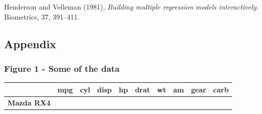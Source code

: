 \documentclass[]{article}
\begin{document}
Henderson and Velleman (1981), \emph{Building multiple regression models
interactively}. Biometrics, 37, 391--411. \newpage

\subsection{Appendix}\label{appendix}

\subsubsection{Figure 1 - Some of the
data}\label{figure-1---some-of-the-data}

\begin{longtable}[c]{@{}cccccccccc@{}}
\toprule
\begin{minipage}[b]{0.22\columnwidth}\centering\strut
~
\strut\end{minipage} &
\begin{minipage}[b]{0.06\columnwidth}\centering\strut
mpg
\strut\end{minipage} &
\begin{minipage}[b]{0.06\columnwidth}\centering\strut
cyl
\strut\end{minipage} &
\begin{minipage}[b]{0.06\columnwidth}\centering\strut
disp
\strut\end{minipage} &
\begin{minipage}[b]{0.05\columnwidth}\centering\strut
hp
\strut\end{minipage} &
\begin{minipage}[b]{0.06\columnwidth}\centering\strut
drat
\strut\end{minipage} &
\begin{minipage}[b]{0.06\columnwidth}\centering\strut
wt
\strut\end{minipage} &
\begin{minipage}[b]{0.05\columnwidth}\centering\strut
am
\strut\end{minipage} &
\begin{minipage}[b]{0.06\columnwidth}\centering\strut
gear
\strut\end{minipage} &
\begin{minipage}[b]{0.06\columnwidth}\centering\strut
carb
\strut\end{minipage}\tabularnewline
\midrule
\endhead
\begin{minipage}[t]{0.22\columnwidth}\centering\strut
\textbf{Mazda RX4}
\strut\end{minipage} &
\begin{minipage}[t]{0.06\columnwidth}\centering\strut

\end{minipage}
\end{longtable}
\end{document}
